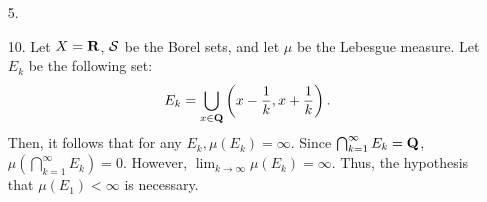 \documentclass{article}
\theoremstyle{remark}
\begin{document}
\thispagestyle{firstpage}
\begin{enumerate}[leftmargin=*]
    \item[5.] 
    \item[10.] Let $X = \mathbf{R}$, $\mathcal{S}$ be the Borel sets, and let $\mu$ 
    be the Lebesgue measure. Let $E_k$ be the following set:
    \[
        E_k = \bigcup_{x \in \mathbf{Q}} \left(x-\frac{1}{k}, x + \frac{1}{k}\right).
    \]
    Then, it follows that for any $E_k, \mu(E_k) = \infty$. Since $\bigcap_{k=1}^\infty E_k = \mathbf{Q}$, 
    $\mu\left(\bigcap_{k=1}^\infty E_k\right) = 0$. However, $\lim_{k\to\infty} \mu(E_k) = \infty$. 
    Thus, the hypothesis that $\mu(E_1) < \infty$ is necessary.
\end{enumerate}
\end{document}
